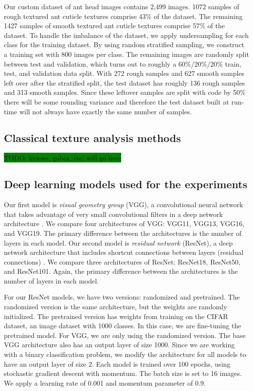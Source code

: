 \documentclass{aci}
\numberwithin{equation}{section}
\begin{document}
Our custom dataset of ant head images contains 2,499 images. 1072 samples of
rough textured ant cuticle textures comprise 43\% of the dataset. The remaining
1427 samples of smooth textured ant cuticle textures comprise 57\% of the
dataset. To handle the imbalance of the dataset, we apply undersampling for each
class for the training dataset. By using random stratified sampling, we
construct a training set with 800 images per class. The remaining images are
randomly split between test and validation, which turns out to roughly a
60\%/20\%/20\% train, test, and validation data split. With 272 rough samples
and 627 smooth samples left over after the stratified split, the test dataset
has roughly 136 rough samples and 313 smooth samples. Since these leftover
samples are split with code by 50\% there will be some rounding variance and
therefore the test dataset built at run-time will not always have exactly the
same number of samples.

\subsection{Classical texture analysis methods}

\colorbox{green}{TODO: kviews, gabor, etc. will go here}

\subsection{Deep learning models used for the experiments}

Our first model is \textit{visual geometry group} (VGG), a convolutional neural
network that takes advantage of very small convolutional filters in a deep
network architecture \cite{simonyan_very_2015}. We compare four architectures of
VGG: VGG11, VGG13, VGG16, and VGG19. The primary difference between the
architectures is the number of layers in each model. Our second model is
\textit{residual network} (ResNet), a deep network architecture that includes
shortcut connections between layers (residual connections) \cite{he_deep_2015}.
We compare three architectures of ResNet: ResNet18, ResNet50, and ResNet101.
Again, the primary difference between the architectures is the number of layers
in each model.

For our ResNet models, we have two versions: randomized and pretrained. The
randomized version is the same architecture, but the weights are randomly
initialized. The pretrained version has weights from training on the CIFAR
dataset, an image dataset with 1000 classes. In this case, we are fine-tuning
the pretrained model. For VGG, we are only using the randomized version. The
base VGG architecture also has an output layer of size 1000. Since we are
working with a binary classification problem, we modify the architecture for all
models to have an output layer of size 2. Each model is trained over 100 epochs,
using stochastic gradient descent with momentum. The batch size is set to 16
images. We apply a learning rate of 0.001 and momentum parameter of 0.9.
\end{document}
